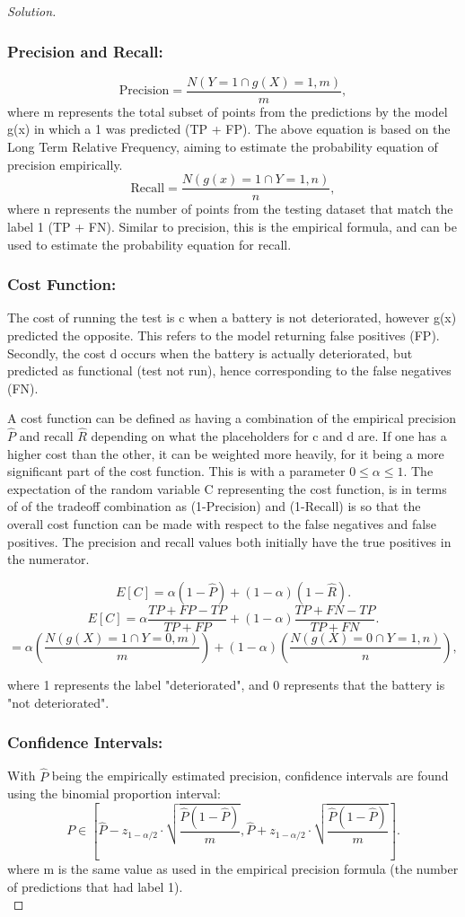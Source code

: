 \documentclass[12pt]{article}
\newenvironment{solution}{\begin{proof}[Solution]}{\end{proof}}
\begin{document}
\begin{solution}
\subsubsection*{Precision and Recall:}
\[
\text{Precision} = \frac{N(Y=1 \cap g(X)=1, m)}{m},
\]
where m represents the total subset of points from the predictions by the model g(x) in which a 1 was predicted (TP + FP). The above equation is based on the Long Term Relative Frequency, aiming to estimate the probability equation of precision empirically.
\[
\text{Recall} = \frac{N(g(x)=1 \cap Y=1,n)}{n},
\]
where n represents the number of points from the testing dataset that match the label 1 (TP + FN). Similar to precision, this is the empirical formula, and can be used to estimate the probability equation for recall.
\subsubsection*{Cost Function:}
The cost of running the test is c when a battery is not deteriorated, however g(x) predicted the opposite. This refers to the model returning false positives (FP). Secondly, the cost d occurs when the battery is actually deteriorated, but predicted as functional (test not run), hence corresponding to the false negatives (FN). 

A cost function can be defined as having a combination of the empirical precision $\hat{P}$ and recall $\hat{R}$ depending on what the placeholders for c and d are. If one has a higher cost than the other, it can be weighted more heavily, for it being a more significant part of the cost function. This is with a parameter $0 \leq \alpha \leq 1$. The expectation of the random variable C representing the cost function, is in terms of of the tradeoff combination as (1-Precision) and (1-Recall) is so that the overall cost function can be made with respect to the false negatives and false positives. The precision and recall values both initially have the true positives in the numerator. 

\[
E[C] = \alpha (1 - \hat{P}) + (1 - \alpha)(1 - \hat{R}).
\]
\[
E[C] = \alpha \frac{TP+FP-TP}{TP + FP} + (1 - \alpha)\frac{TP+FN-TP}{TP + FN}.
\]
\[
= \alpha (\frac{N(g(X)=1 \cap Y=0,m)}{m}) + (1 - \alpha)(\frac{N(g(X)=0 \cap Y=1,n)}{n}),
\]

where 1 represents the label "deteriorated", and 0 represents that the battery is "not deteriorated".

\subsubsection*{Confidence Intervals:}
With $\hat{P}$ being the empirically estimated precision, confidence intervals are found using the binomial proportion interval:
\[
P \in \left[ \hat{P} - z_{1-\alpha/2} \cdot \sqrt{\frac{\hat{P}(1 - \hat{P})}{m}}, \hat{P} + z_{1-\alpha/2} \cdot \sqrt{\frac{\hat{P}(1 - \hat{P})}{m}} \right].
\]
where m is the same value as used in the empirical precision formula (the number of predictions that had label 1). \\


\end{solution}
\end{document}
